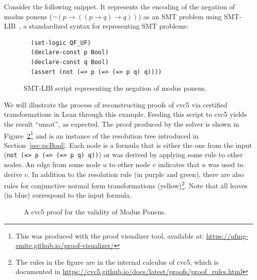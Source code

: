 Consider the following snippet. It represents the encoding of the negation of modus ponens
($\neg (p \rightarrow ((p \rightarrow q) \rightarrow q))$) as an SMT problem using SMT-LIB~\cite{smtlib},
a standardized syntax for representing SMT problems:

\begin{figure}[h]
\begin{verbatim}
  (set-logic QF_UF)
  (declare-const p Bool)
  (declare-const q Bool)
  (assert (not (=> p (=> (=> p q) q))))
\end{verbatim}
\caption{SMT-LIB script representing the negation of modus ponens.}\label{negModusPonens}
\end{figure}

We will illustrate the process of reconstructing proofs of cvc5 via certified transformations
in Lean through this example. Feeding this script to cvc5 yields the result ``unsat'', as expected.
The proof produced by the solver is shown in Figure~\ref{fig:cvc5-proof}\footnote{This was produced with the proof visualizer tool, available at: \url{https://ufmg-smite.github.io/proof-visualizer/}} and is an instance of the resolution tree introduced in Section~\ref{sec:pcBool}.
Each node is a formula that is either the one from the input (\texttt{not (=> p (=> (=> p q) q))}) or was derived by applying some
rule to other nodes. An edge from some node $u$ to other node $v$ indicates that
$u$ was used to derive $v$.
In addition to the resolution rule (in purple and green), there are also rules for conjunctive normal form transformations (yellow)\footnote{The rules in the figure are in the internal calculus of cvc5, which is documented in \url{https://cvc5.github.io/docs/latest/proofs/proof_rules.html}}. Note that all leaves (in blue) correspond to the input formula.

\makeatletter
\setlength{\@fptop}{0pt}
\makeatother

\begin{figure}[t!]
  \centering
  \caption{A cvc5 proof for the validity of Modus Ponens.}
  \label{fig:cvc5-proof}
\end{figure}

